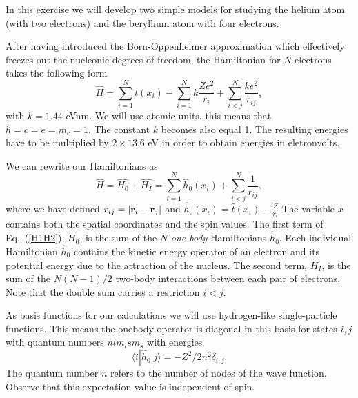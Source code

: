 \begin{prob}
In this exercise  we will develop two simple models for studying the 
helium atom (with two electrons) and the beryllium atom with four electrons.

After having introduced the  Born-Oppenheimer approximation which effectively freezes out the nucleonic degrees
of freedom, the Hamiltonian for $N$ electrons takes the following form 
\[
  \hat{H} = \sum_{i=1}^{N} t(x_i) 
  - \sum_{i=1}^{N} k\frac{Ze^2}{r_i} + \sum_{i<j}^{N} \frac{ke^2}{r_{ij}},
\]
with $k=1.44$ eVnm. We will use atomic units, this means
that $\hbar=c=e=m_e=1$. The constant $k$ becomes also equal 1. 
The resulting energies have to be multiplied by $2\times 13.6$ eV
in order to obtain energies in eletronvolts.

 We can rewrite our Hamiltonians as
\begin{equation}
    \hat{H} = \hat{H_0} + \hat{H_I} 
    = \sum_{i=1}^{N}\hat{h}_0(x_i) + \sum_{i<j}^{N}\frac{1}{r_{ij}},
\label{H1H2}
\end{equation}
where  we have defined $r_{ij}=| {\bf r}_i-{\bf r}_j|$ and
$\hat{h}_0(x_i) =  \hat{t}(x_i) - \frac{Z}{r_i}$
The variable $x$ contains both the spatial coordinates and the spin values.
The first term of Eq.~(\ref{H1H2}), $H_0$, is the sum of the $N$
\emph{one-body} Hamiltonians $\hat{h}_0$. Each individual
Hamiltonian $\hat{h}_0$ contains the kinetic energy operator of an
electron and its potential energy due to the attraction of the
nucleus. The second term, $H_I$, is the sum of the $N(N-1)/2$
two-body interactions between each pair of electrons. Note that the double sum carries a restriction $i<j$.

As basis functions for our calculations we will use hydrogen-like single-particle functions.  This means the onebody operator is diagonal in this basis for states $i,j$ with quantum numbers $nlm_lsm_s$ with  
energies 
\[\langle i|\hat{h}_0| j\rangle =  -Z^2/2n^2\delta_{i,j}.\]  
The quantum number $n$ refers to the number of nodes 
of the wave function.  Observe that this expectation value is independent of spin.


\end{prob}
